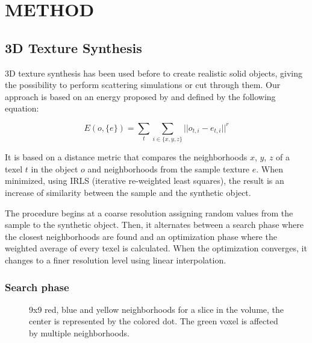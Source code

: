 \section{\uppercase{Method}}
\label{sec:Methods}
\subsection{3D Texture Synthesis}
\label{sec:TextureSynthesis}

3D texture synthesis has been used before to create realistic solid objects,
giving the possibility to perform scattering simulations or cut through them.
Our approach is based on an energy proposed by \cite{kwatra:2005:SIGGRAPH} and defined by the following equation:

\begin{equation}
 E(o, \{e\} ) = \sum_{t} \sum_{i \in \{x, y, z\}} || o_{t, i} - e_{t, i} ||^r
 \label{equ:imagenergy} 
\end{equation}

It is based on a distance metric that compares the neighborhoods $x$, $y$, $z$ 
of a texel $t$ in the object $o$ and neighborhoods from the sample texture $e$. 
When minimized, using IRLS (iterative re-weighted least squares), 
the result is an increase of similarity between the sample and the synthetic object.

The procedure begins at a coarse resolution assigning random values from the sample to the synthetic object. 
Then, it alternates between a search phase where the closest neighborhoods are found 
and an optimization phase where the weighted average of every texel is calculated. 
When the optimization converges, it changes to a finer resolution level using linear interpolation.

\subsubsection{Search phase}
\label{sec:SearchPhase}

\begin{figure}[!h]
  \vspace{-0.2cm}
  \centering
  \caption{9x9 red, blue and yellow neighborhoods for a slice in the volume, the center is represented by the colored dot.
           The green voxel is affected by multiple neighborhoods.}
  \label{fig:search_phase}
  \vspace{-0.1cm}
 \end{figure}

